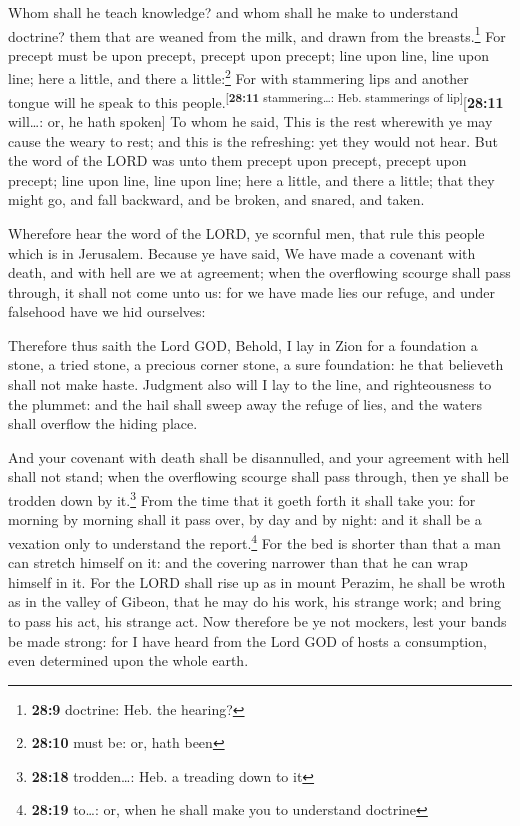  Whom shall he teach knowledge? and whom shall he make to
understand doctrine? them that are weaned from the milk, and drawn from
the breasts.\footnote{\textbf{28:9} doctrine: Heb. the hearing?}
 For precept must be upon precept, precept upon precept;
line upon line, line upon line; here a little, and there a
little:\footnote{\textbf{28:10} must be: or, hath been} 
For with stammering lips and another tongue will he speak to this
people.\textsuperscript{{[}\textbf{28:11} stammering\ldots: Heb.
stammerings of lip{]}}{[}\textbf{28:11} will\ldots: or, he hath
spoken{]}  To whom he said, This is the rest wherewith ye
may cause the weary to rest; and this is the refreshing: yet they would
not hear.  But the word of the LORD was unto them precept
upon precept, precept upon precept; line upon line, line upon line; here
a little, and there a little; that they might go, and fall backward, and
be broken, and snared, and taken.

 Wherefore hear the word of the LORD, ye scornful men,
that rule this people which is in Jerusalem.  Because ye
have said, We have made a covenant with death, and with hell are we at
agreement; when the overflowing scourge shall pass through, it shall not
come unto us: for we have made lies our refuge, and under falsehood have
we hid ourselves:

 Therefore thus saith the Lord GOD, Behold, I lay in Zion
for a foundation a stone, a tried stone, a precious corner stone, a sure
foundation: he that believeth shall not make haste. 
Judgment also will I lay to the line, and righteousness to the plummet:
and the hail shall sweep away the refuge of lies, and the waters shall
overflow the hiding place.

 And your covenant with death shall be disannulled, and
your agreement with hell shall not stand; when the overflowing scourge
shall pass through, then ye shall be trodden down by it.\footnote{\textbf{28:18}
  trodden\ldots: Heb. a treading down to it}  From the
time that it goeth forth it shall take you: for morning by morning shall
it pass over, by day and by night: and it shall be a vexation only to
understand the report.\footnote{\textbf{28:19} to\ldots: or, when he
  shall make you to understand doctrine}  For the bed is
shorter than that a man can stretch himself on it: and the covering
narrower than that he can wrap himself in it.  For the
LORD shall rise up as in mount Perazim, he shall be wroth as in the
valley of Gibeon, that he may do his work, his strange work; and bring
to pass his act, his strange act.  Now therefore be ye
not mockers, lest your bands be made strong: for I have heard from the
Lord GOD of hosts a consumption, even determined upon the whole earth.


